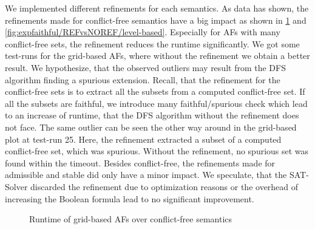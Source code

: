 We implemented different refinements for each semantics. As data has shown, the refinements made for conflict-free semantics have a big impact as shown in \cref{fig:expfaithful/REFvsNOREF/grid-based} and \cref{fig:expfaithful/REFvsNOREF/level-based}. Especially for AFs with many conflict-free sets, the refinement reduces the runtime significantly. We got some test-runs for the grid-based AFs, where without the refinement we obtain a better result. We hypothesize, that the observed outliers may result from the DFS algorithm finding a spurious extension. Recall, that the refinement for the conflict-free sets is to extract all the subsets from a computed conflict-free set. If all the subsets are faithful, we introduce many faithful/spurious check which lead to an increase of runtime, that the DFS algorithm without the refinement does not face. The same outlier can be seen the other way around in the grid-based plot at test-run 25. Here, the refinement extracted a subset of a computed conflict-free set, which was spurious. Without the refinement, no spurious set was found within the timeout. Besides conflict-free, the refinements made for admissible and stable did only have a minor impact. We speculate, that the SAT-Solver discarded the refinement due to optimization reasons or the overhead of increasing the Boolean formula lead to no significant improvement.


\begin{figure}[H]
    \centering
    \caption{Runtime of grid-based AFs over conflict-free semantics}
    \label{fig:expfaithful/REFvsNOREF/grid-based}
\end{figure}

